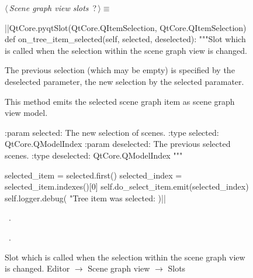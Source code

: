 \documentclass[%
    a4paper,    %
    justified,  %
    nobib,      %
    openany     %
]{tufte-book}
\begin{document}
\begin{figure}
\begin{flushleft} \small
\begin{minipage}{\linewidth}\label{scrap43}\raggedright\small
{} $\langle\,${\itshape Scene graph view slots}\nobreak\ {\footnotesize {?}}$\,\rangle\equiv$
\vspace{-1ex}
\begin{pythoncode}
|\normalfont{}\fontfamily{}|QtCore.pyqtSlot(QtCore.QItemSelection, QtCore.QItemSelection)
def on_tree_item_selected(self, selected, deselected):
    """Slot which is called when the selection within the scene
    graph view is changed.

    The previous selection (which may be empty) is specified by
    the deselected parameter, the new selection by the selected
    paramater.

    This method emits the selected scene graph item as scene
    graph view model.

    :param selected: The new selection of scenes.
    :type  selected: QtCore.QModelIndex
    :param deselected: The previous selected scenes.
    :type  deselected: QtCore.QModelIndex
    """

    selected_item = selected.first()
    selected_index = selected_item.indexes()[0]
    self.do_select_item.emit(selected_index)
    self.logger.debug(
        "Tree item was selected: %
    )|\NWsep|
\end{pythoncode}
\vspace{1.5ex}
\footnotesize
\begin{list}{}{\setlength{\itemsep}{-\parsep}\setlength{\itemindent}{-\leftmargin}}
\item \NWtxtMacroDefBy\ .
\item \NWtxtMacroRefIn\ .

\item{}
\end{list}
\end{minipage}\vspace{4ex}
\end{flushleft}
\caption{Slot which is called when the selection within the scene graph view is
  changed.
  \newline{}\newline{}Editor $\rightarrow$ Scene graph view
  $\rightarrow$ Slots}
\label{editor:lst:scene-graph-view:slots:on-tree-item-selected}
\end{figure}
\end{document}
